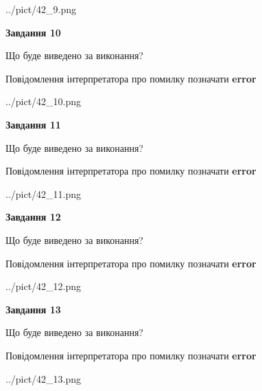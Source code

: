 \documentclass[11pt, ukrainian]{article}
\begin{document}
{\begin {large}
\begin{center}
	{../pict/42_9.png}
\end{center}
\newpage

{\begin {center}\textbf{Завдання 10}\end {center}}\par
Що буде виведено за виконання? \par
Повідомлення інтерпретатора про помилку позначати \textbf{error}

\begin{center}
	{../pict/42_10.png}
\end{center}
\newpage

{\begin {center}\textbf{Завдання 11}\end {center}}\par
Що буде виведено за виконання? \par
Повідомлення інтерпретатора про помилку позначати \textbf{error}

\begin{center}
	{../pict/42_11.png}
\end{center}
\newpage

{\begin {center}\textbf{Завдання 12}\end {center}}\par
Що буде виведено за виконання? \par
Повідомлення інтерпретатора про помилку позначати \textbf{error}

\begin{center}
	{../pict/42_12.png}
\end{center}
\newpage

{\begin {center}\textbf{Завдання 13}\end {center}}\par
Що буде виведено за виконання? \par
Повідомлення інтерпретатора про помилку позначати \textbf{error}

\begin{center}
	{../pict/42_13.png}
\end{center}
\newpage


\end{large}}
\end{document}
